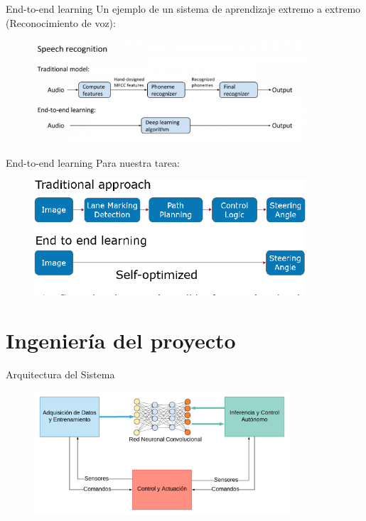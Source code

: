 \documentclass[10pt]{beamer}
\begin{document}
\begin{frame}{End-to-end learning}
    Un ejemplo de un sistema de aprendizaje extremo a extremo (Reconocimiento de voz):

    \begin{figure}[!h] 
        \centering
        \includegraphics[width=0.90\textwidth]{../img/voicenn}
    \end{figure}
\end{frame}

\begin{frame}{End-to-end learning}
    Para nuestra tarea:

    \begin{figure}[!h] 
        \centering
        \includegraphics[width=0.90\textwidth]{../img/carendtoend}
    \end{figure}
\end{frame}

\section*{Ingeniería del proyecto}

\begin{frame}{Arquitectura del Sistema}
    \begin{figure}[!h] 
        \centering
        \includegraphics[width=0.85\textwidth]{../img/arquitectura}
        \end{figure}
\end{frame}
\end{document}
